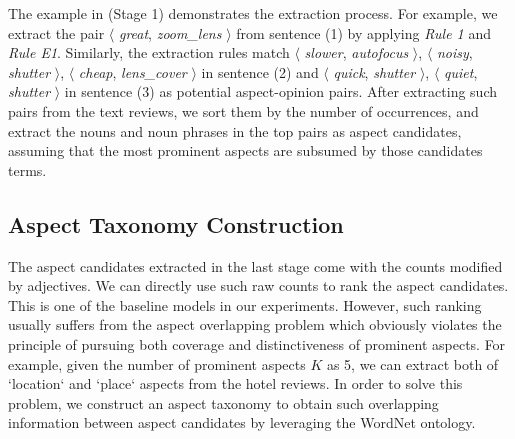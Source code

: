 The example in  (Stage 1) demonstrates the extraction process. 
For example, we extract the pair $\langle$ \emph{great}, \emph{zoom\_lens }$\rangle$ from sentence (1) by applying
\emph{Rule 1} and \emph{Rule E1}.
Similarly, the extraction rules match
 $\langle$ \emph{slower}, \emph{autofocus} $\rangle$,
  $\langle$ \emph{noisy}, \emph{shutter} $\rangle$,
   $\langle$ \emph{cheap}, \emph{lens\_cover} $\rangle$ in 
   sentence (2) and 
 $\langle$ \emph{quick}, \emph{shutter} $\rangle$, $\langle$ \emph{quiet}, \emph{shutter} $\rangle$ in sentence (3) as potential aspect-opinion pairs.
After extracting such pairs from the text reviews, 
we sort them by the number of occurrences,
and extract the nouns and noun phrases in the top pairs
as aspect candidates, assuming that
the most prominent aspects are subsumed by those candidates 
terms. 

% 


\subsection{Aspect Taxonomy Construction}
\label{sec:taxonomy}
The aspect candidates extracted in the last stage come with the counts 
modified by adjectives. We can directly use such raw counts to rank 
the aspect candidates. This is one of the baseline models in 
our experiments.
However, such ranking usually suffers from the aspect overlapping problem
which obviously violates the principle of pursuing both coverage and 
distinctiveness of prominent aspects.
For example, given the number of prominent aspects 
$K$ as 5,
we can extract both of `location` and `place` aspects from
the hotel reviews. 
In order to solve this problem, we construct an aspect taxonomy 
to obtain such overlapping information between aspect candidates by
leveraging the WordNet ontology. 

